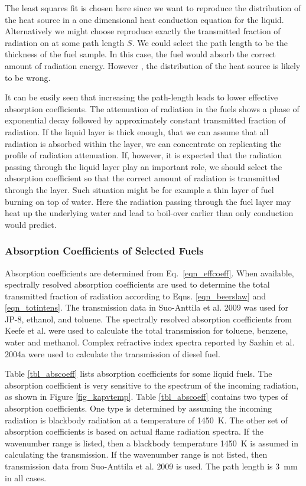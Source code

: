 The least squares fit is chosen here since we want to reproduce the distribution of the heat source in a one dimensional heat conduction equation for the liquid. Alternatively we might choose reproduce exactly the transmitted fraction of radiation on at some path length $S$. We could select the path length to be the thickness of the fuel sample. In this case, the fuel would absorb the correct amount of radiation energy. However , the distribution of the heat source is likely to be wrong.

It can be easily seen that increasing the path-length leads to lower effective absorption coefficients.  The attenuation of radiation in the fuels shows a phase of exponential decay followed by approximately constant transmitted fraction of radiation. If the liquid layer is thick enough, that we can assume that all radiation is absorbed within the layer, we can concentrate on replicating the profile of radiation attenuation. If, however, it is expected that the radiation passing through the liquid layer play an important role, we should select the absorption coefficient so that the correct amount of radiation is transmitted through the layer. Such situation might be for example a thin layer of fuel burning on top of water. Here the radiation passing through the fuel layer may heat up the underlying water and lead to boil-over earlier than only conduction would predict.

\subsubsection{Absorption Coefficients of Selected Fuels}

Absorption coefficients are determined from Eq.~\ref{eqn_effcoeff}. When available, spectrally resolved absorption coefficients are used to determine the total transmitted fraction of radiation according to Eqns. \ref{eqn_beerslaw} and \ref{eqn_totintens}.  The transmission data in Suo-Anttila et al. 2009 \cite{Suo-Anttila:PCT2009} was used for JP-8, ethanol, and toluene. The spectrally resolved absorption coefficients from Keefe et al. were used to calculate the total transmission for toluene, benzene, water and methanol. Complex refractive index spectra reported by Sazhin et al. 2004a \cite{Sazhin:JHT2004a} were used to calculate the transmission of diesel fuel. 

Table \ref{tbl_abscoeff} lists absorption coefficients for some liquid fuels. The absorption coefficient is very sensitive to the spectrum of the incoming radiation, as shown in Figure \ref{fig_kapvtemp}. Table \ref{tbl_abscoeff} contains two types of absorption coefficients. One type is determined by assuming the incoming radiation is blackbody radiation at a temperature of 1450~K. The other set of absorption coefficients is based on actual flame radiation spectra. If the wavenumber range is listed, then a blackbody temperature 1450~K is assumed in calculating the transmission. If the wavenumber range is not listed, then transmission data from Suo-Anttila et al. 2009 \cite{Suo-Anttila:PCT2009} is used. The path length is 3~mm in all cases. 

